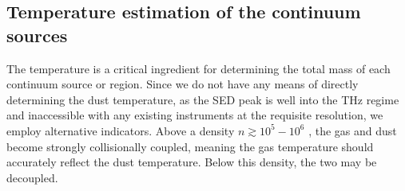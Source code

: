 \documentclass{emulateapj}
\begin{document}


% 
% 
% 


\subsection{Temperature estimation of the continuum sources}
\label{sec:temperature}
The temperature is a critical ingredient for determining the total mass of each
continuum source or region. Since we do not have any means of directly
determining the dust temperature, as the SED peak is well into the THz regime
and inaccessible with any existing instruments at the requisite resolution, we
employ alternative indicators.  Above a density $n\gtrsim10^5-10^6$ \percc,
the gas and dust become strongly collisionally coupled, meaning the gas
temperature should accurately reflect the dust temperature.  Below this density,
the two may be decoupled.
\end{document}
